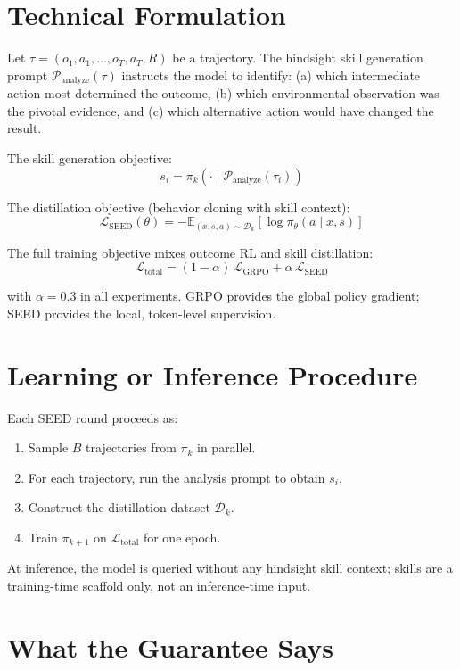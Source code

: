 \documentclass[10pt,twocolumn]{article}
\begin{document}
\section{Technical Formulation}

Let $\tau = (o_1, a_1, \ldots, o_T, a_T, R)$ be a trajectory.
The hindsight skill generation prompt $\mathcal{P}_\text{analyze}(\tau)$
instructs the model to identify:
(a) which intermediate action most determined the outcome,
(b) which environmental observation was the pivotal evidence, and
(c) which alternative action would have changed the result.

The skill generation objective:
\[
  s_i = \pi_k\!\left(\cdot \mid \mathcal{P}_\text{analyze}(\tau_i)\right)
\]

The distillation objective (behavior cloning with skill context):
\[
  \mathcal{L}_\text{SEED}(\theta) =
    -\mathbb{E}_{(x,s,a) \sim \mathcal{D}_k}
    \!\left[\log \pi_\theta(a \mid x, s)\right]
\]

The full training objective mixes outcome RL and skill distillation:
\[
  \mathcal{L}_\text{total} =
    (1-\alpha)\,\mathcal{L}_\text{GRPO} + \alpha\,\mathcal{L}_\text{SEED}
\]

with $\alpha = 0.3$ in all experiments. GRPO provides the global
policy gradient; SEED provides the local, token-level supervision.

\section{Learning or Inference Procedure}

Each SEED round proceeds as:
\begin{enumerate}[itemsep=2pt,parsep=0pt]
  \item Sample $B$ trajectories from $\pi_k$ in parallel.
  \item For each trajectory, run the analysis prompt to obtain $s_i$.
  \item Construct the distillation dataset $\mathcal{D}_k$.
  \item Train $\pi_{k+1}$ on $\mathcal{L}_\text{total}$ for one epoch.
\end{enumerate}

At inference, the model is queried without any hindsight skill context;
skills are a training-time scaffold only, not an inference-time input.

\section{What the Guarantee Says}
\end{document}
